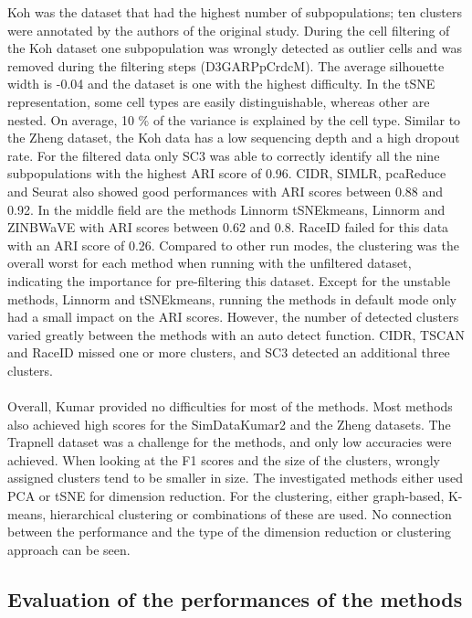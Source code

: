 \documentclass[12pt, a4paper]{article}\usepackage[]{graphicx}\usepackage[]{color}
\begin{document}
Koh was the dataset that had the highest number of subpopulations; ten clusters were annotated by the authors of the original study. During the cell filtering of the Koh dataset one subpopulation was wrongly detected as outlier cells and was removed during the filtering steps (D3GARPpCrdcM). The average silhouette width is -0.04 and the dataset is one with the highest difficulty. In the tSNE representation, some cell types are easily distinguishable, whereas other are nested. On average, 10 \% of the variance is explained by the cell type. Similar to the Zheng dataset, the Koh data has a low sequencing depth and a high dropout rate. For the filtered data only SC3 was able to correctly identify all the nine subpopulations with the highest ARI score of 0.96. CIDR, SIMLR, pcaReduce and Seurat also showed good performances with ARI scores between 0.88 and 0.92. In the middle field are the methods Linnorm tSNEkmeans, Linnorm and ZINBWaVE with ARI scores between 0.62 and 0.8. RaceID failed for this data with an ARI score of 0.26. Compared to other run modes, the clustering was the overall worst for each method when running with the unfiltered dataset, indicating the importance for pre-filtering this dataset. Except for the unstable methods, Linnorm and tSNEkmeans, running the methods in default mode only had a small impact on the ARI scores. However, the number of detected clusters varied greatly between the methods with an auto detect function. CIDR, TSCAN and RaceID missed one or more clusters, and SC3 detected an additional three clusters.
\paragraph{}

Overall, Kumar provided no difficulties for most of the methods. Most methods also achieved high scores for the SimDataKumar2 and the Zheng datasets. The Trapnell dataset was a challenge for the methods, and only low accuracies were achieved. When looking at the F1 scores and the size of the clusters, wrongly assigned clusters tend to be smaller in size. The investigated methods either used PCA or tSNE for dimension reduction. For the clustering, either graph-based, K-means, hierarchical clustering or combinations of these are used. No connection between the performance and the type of the dimension reduction or clustering approach can be seen.

\newpage
\subsection{Evaluation of the performances of the methods}
\end{document}
